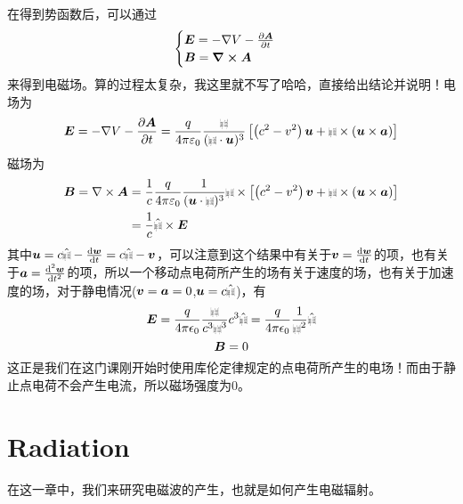 \documentclass[14pt,oneside]{book}
\def\rr{{\mbox{$\resizebox{.09in}{.08in}{\texttt{[image: ScriptR]}}$}}}
\def\br{{\mbox{$\resizebox{.09in}{.08in}{\texttt{[image: BoldR]}}$}}}
\newcommand{\hr}{\hat{\br}}
\def \E{\vb*{E}}
\def \B{\vb*{B}}
\def \A{\vb*{A}}
\begin{document}
\begin{large}
在得到势函数后，可以通过
\begin{align}
\begin{cases}
	   \E=-\nabla V-\pdv{\A}{t}\\
	   \B=\curl{\A}
\end{cases}
\end{align}
来得到电磁场。算的过程太复杂，我这里就不写了哈哈，直接给出结论并说明！电场为
\begin{equation}
\vb*{E}=-\nabla V-\frac{\partial \vb*{A}}{\partial t}=\frac{q}{4 \pi \varepsilon_0} \frac{\rr}{(\br \cdot \vb*{u})^3}\left[\left(c^2-v^2\right) \vb*{u}+\br \times(\vb*{u} \times \vb*{a})\right]
\end{equation}
磁场为
\begin{equation}
\begin{aligned}
\vb*{B} =\nabla \times \vb*{A}&=\frac{1}{c} \frac{q}{4 \pi \varepsilon_0} \frac{1}{(\vb*{u} \cdot \br)^3} \br \times\left[\left(c^2-v^2\right) \vb*{v}+\br \times(\vb*{u} \times \vb*{a})\right] \\
& =\frac{1}{c} \hat{\br} \times \vb*{E}
\end{aligned}
\end{equation}
其中$\vb*{u}=c\hr-\dv{\vb*{w}}{t}=c\hr-\vb*{v}$，可以注意到这个结果中有关于$\vb*{v}=\dv{\vb*{w}}{t}$的项，也有关于$\vb*{a}=\dv[2]{\vb*{w}}{t}$的项，所以一个移动点电荷所产生的场有关于速度的场，也有关于加速度的场，对于静电情况($\vb*{v}=\vb*{a}=0$,$\vb*{u}=c\hr$)，有
\begin{equation}
  \vb*{E}=\frac{q}{4\pi\epsilon_0}\frac{\rr}{c^3\rr^3}c^3\hr=\frac{q}{4\pi\epsilon_0}\frac{1}{\rr^2}\hr
\end{equation}
\begin{equation}
  \B=0
\end{equation}
这正是我们在这门课刚开始时使用库伦定律规定的点电荷所产生的电场！而由于静止点电荷不会产生电流，所以磁场强度为0。

\chapter{Radiation}
在这一章中，我们来研究电磁波的产生，也就是如何产生电磁辐射。


\end{large}
\end{document}
